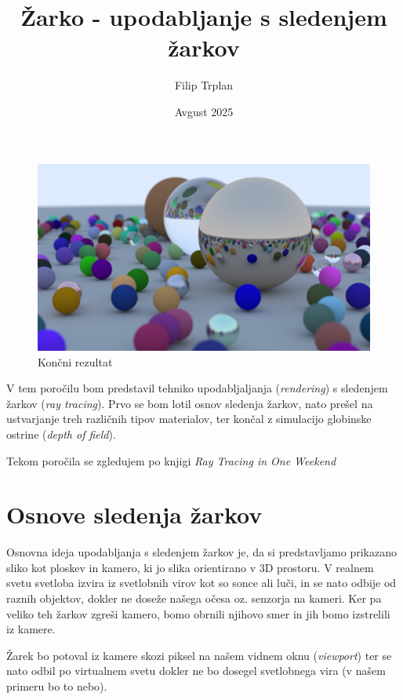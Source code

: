 \documentclass[12pt, a4paper]{article}
\title{Žarko - upodabljanje s sledenjem žarkov}
\author{Filip Trplan}
\date{Avgust 2025}
\begin{document}
\maketitle

\begin{figure}[h]
	\centering
	\includegraphics[width=\textwidth]{cover}
	\caption{Končni rezultat}
\end{figure}

V tem poročilu bom predstavil tehniko upodabljaljanja (\textit{rendering}) s sledenjem žarkov
(\textit{ray tracing}). Prvo se bom lotil osnov sledenja žarkov, nato prešel na ustvarjanje treh
različnih tipov materialov, ter končal z simulacijo globinske ostrine (\textit{depth of field}).

Tekom poročila se zgledujem po knjigi \textit{Ray Tracing in One Weekend} \cite{Shirley2025RTW1}

\section{Osnove sledenja žarkov}

Osnovna ideja upodabljanja s sledenjem žarkov je, da si predstavljamo prikazano sliko kot ploskev in kamero,
ki jo slika orientirano v 3D prostoru. V realnem svetu svetloba izvira iz svetlobnih virov kot so sonce ali luči,
in se nato odbije od raznih objektov, dokler ne doseže našega očesa oz. senzorja na kameri.
Ker pa veliko teh žarkov zgreši kamero, bomo obrnili njihovo smer in jih bomo izstrelili iz kamere.

Žarek bo potoval iz kamere skozi piksel na našem vidnem oknu (\textit{viewport}) ter se nato odbil po
virtualnem svetu dokler ne bo dosegel svetlobnega vira (v našem primeru bo to nebo).
\end{document}
